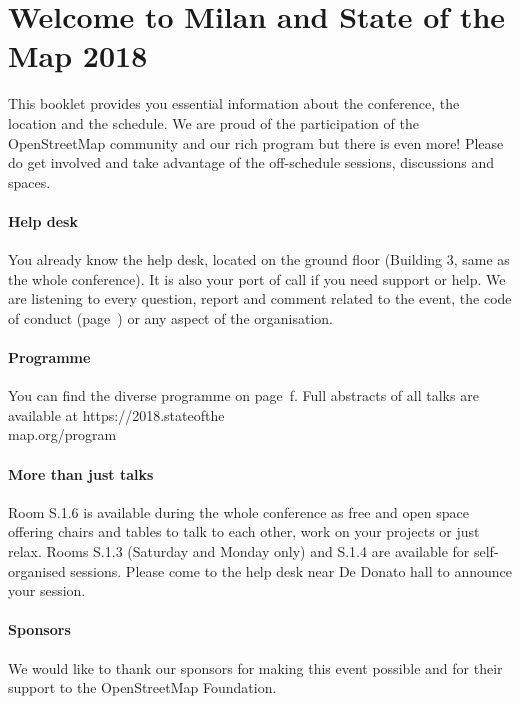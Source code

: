 \newpage
\enlargethispage{1\baselineskip}
\section*{Welcome to Milan and State of the Map 2018} \label{welcome}
This booklet provides you essential information
about the conference, the location and the schedule.  We are proud of the participation of the
OpenStreetMap community and our rich program but there is even more!  Please do get involved and
take advantage of the off-schedule sessions, discussions and spaces.

\paragraph*{Help desk} \label{welcome-helpdesk}
You already know the help desk, located on the ground floor (Building 3, same as the whole
conference). It is also your port of call if you need support or help. We are listening to every
question, report and comment related to the event, the code of conduct (page~\pageref{coc}) or any
aspect of the organisation.

\paragraph*{Programme}
You can find the diverse programme on page~\pageref{saturday}f. Full abstracts of all talks are available at https://2018.stateofthe\\map.org/program

\paragraph*{More than just talks} \label{welcome-location}
Room S.1.6 is available during the whole conference as free and open space offering chairs and tables
to talk to each other, work on your projects or just relax. Rooms S.1.3 (Saturday and Monday only) and S.1.4 are available for
self-organised sessions.  Please come to the help desk near De Donato hall to announce your session.

\paragraph*{Sponsors} \label{welcome-sponsors}
We would like to thank our sponsors for making this event possible and for their support to the
OpenStreetMap Foundation.
\newpage
